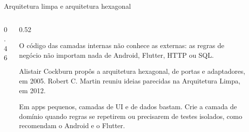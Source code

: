 \begin{frame}{Arquitetura limpa e arquitetura hexagonal}
  \begin{columns}[c]
    \begin{column}{0.46\textwidth}
      \centering
    \end{column}
    \begin{column}{0.52\textwidth}
      \begin{definicao}
        O código das camadas internas não conhece as externas: as regras de negócio não importam nada de Android, Flutter, HTTP ou SQL.
      \end{definicao}
      \begin{historia}
        Alistair Cockburn propôs a arquitetura hexagonal, de portas e adaptadores, em 2005. Robert C. Martin reuniu ideias parecidas na Arquitetura Limpa, em 2012.
      \end{historia}
      \begin{dica}
        Em apps pequenos, camadas de UI e de dados bastam. Crie a camada de domínio quando regras se repetirem ou precisarem de testes isolados, como recomendam o Android e o Flutter.
      \end{dica}
    \end{column}
  \end{columns}
\end{frame}

